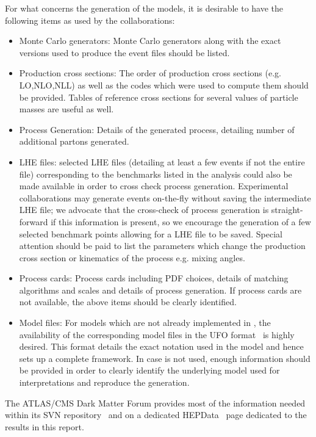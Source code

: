 For what concerns the generation of the models, it is desirable to have the following items as used by the collaborations:
\begin {itemize}
	\item Monte Carlo generators: Monte Carlo generators along with the exact versions used to produce the event files should be listed. 
	\item Production cross sections: The order of production cross sections (e.g. LO,NLO,NLL) as well as the codes which were used to compute them should be provided. Tables of reference cross sections for several values of particle masses are useful as well. 
	\item Process Generation: Details of the generated process, detailing number of additional partons generated. 
	\item LHE files: selected LHE files (detailing at least a few events if not the entire file) corresponding to the benchmarks listed in the analysis could also be made available in order to cross check process generation. Experimental collaborations may generate events on-the-fly without saving the intermediate LHE file; we advocate that the cross-check of process generation is straight-forward if this information is present, so we encourage the generation of a few selected benchmark points allowing for a LHE file to be saved. Special attention should be paid to list the parameters which change the production cross section or kinematics of the process e.g. mixing angles. 
	\item Process cards: Process cards including  PDF choices, details of matching algorithms and scales and details of process generation. If process cards are not available, the above items should be clearly identified. 
	\item Model files: For models which are not already implemented in \madgraph, the availability of the corresponding model files in the UFO format~\cite{Degrande:2011ua} is highly desired. This format details the exact notation used in the model and hence sets up a complete framework. In case \madgraph is not used, enough information should be provided in order to clearly identify the underlying model used for interpretations and reproduce the generation. 
\end{itemize}
The ATLAS/CMS Dark Matter Forum provides most of the information needed within its SVN repository~\cite{ForumSVN} and on a dedicated HEPData~\cite{HEPData} page dedicated to the results in this report.

